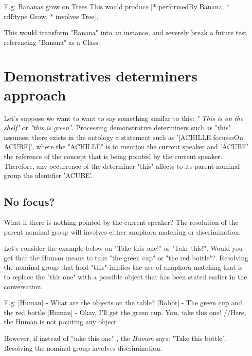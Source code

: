 \documentclass[twoside,a4paper,10pt]{report}
\newcommand{\dokutitleleveltree}[1]{\section{#1}}
\newcommand{\dokutitlelevelfour}[1]{\subsection{#1}}
\newcommand{\dokuitalic}[1]{\textsl{#1}}
\begin{document}
\small
\begin{verbatimtab}
  
  E.g: Bananas grow on Trees
  This would produce 
  [* performedBy Banana, 
   * rdf:type Grow,
   * involves Tree], 
  
  This would transform "Banana" into an instance, and severely break a future test referencing
"Banana" as a Class.
  
\end{verbatimtab}
\normalsize

\dokutitleleveltree{Demonstratives determiners approach}
\label{b4ad6f4ec31665f1d879aeafb5ba415e}%
Let's suppose we want to want to say something similar to this: \dokuitalic{" This is on the shelf"} or \dokuitalic{"this is green"}.
Processing demonstrative determiners such as "this" assumes, there exists in the ontology a statement such as '[ACHILLE focusesOn A{\textunderscore}CUBE]’, where the "ACHILLE"
is to mention the current speaker and 'A{\textunderscore}CUBE' the reference of the concept that is being pointed by the current speaker.
Therefore, any occurrence of the determiner "this" affects to its parent nominal group the identifier 'A{\textunderscore}CUBE'.


\dokutitlelevelfour{No focus?}
What if there is nothing pointed by the current speaker? The resolution of the parent nominal group will involves either anaphora matching or discrimination.

Let's consider the example below on "Take this one!" or "Take this!".
Would you get that the Human means to take "the green cup" or "the red bottle"?. 
Resolving the nominal group that hold "this" implies the use of anaphora matching that is to replace the "this one" with a possible object that has been stated earlier in the conversation.



\small
\begin{verbatimtab}
  E.g: 
  [Human] - What are the objects on the table?
  [Robot] - The green cup and the red bottle
  [Human] - Okay, I'll get the green cup. You, take this one! //Here, the Human is not pointing any
object
\end{verbatimtab}
\normalsize

However, if instead of "take this one" , the \dokuitalic{Human} says: "Take this bottle". Resolving the nominal group involves discrimination. 
\end{document}
